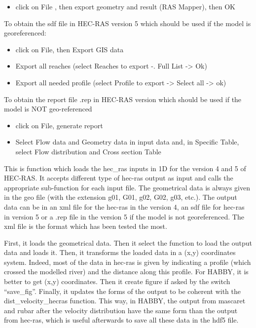 \documentclass[letterpaper,10pt,english]{sphinxmanual}
\begin{document}
\begin{fulllineitems}
\begin{itemize}
\item {} 
click on File , then export geometry and result (RAS Mapper), then OK

\end{itemize}

To obtain the sdf file in HEC-RAS version 5 which should be used if the model is georeferenced:
\begin{itemize}
\item {} 
click on File, then Export GIS data

\item {} 
Export all reaches (select Reaches to export -. Full List -\textgreater{} Ok)

\item {} 
Export all needed profile (select Profile to export -\textgreater{} Select all -\textgreater{} ok)

\end{itemize}

To obtain the report file .rep in HEC-RAS version which should be used if the model is NOT geo-referenced
\begin{itemize}
\item {} 
click on File, generate report

\item {} 
Select Flow data and Geometry data in input data and, in Specific Table, select Flow distribution and
Cross section Table

\end{itemize}


This is function which loads the hec\_ras inputs in 1D for the version 4 and 5 of HEC-RAS. It accepts different type
of hec-ras output as input and calls the appropriate sub-function for each input file.  The geometrical data is
always given in the geo file (with the extension g01, G01, g02, G02, g03, etc.). The output data can be in an xml
file for the hec-ras in the version 4, an sdf file for hec-ras in version 5 or a .rep file in the version 5 if the
model is not georeferenced. The xml file is the format which has been tested the most.

First, it loads the geometrical data. Then it select the function to load the output data and loads it. Then, it
transforms the loaded data in a (x,y) coordinates system. Indeed, most of the data in hec-ras is given by indicating
a profile (which crossed the modelled river) and the distance along this profile. For HABBY, it is better to get
(x,y) coordinates. Then it create figure if asked by the switch “save\_fig”. Finally, it updates the forms of the
output to be coherent with the dist\_velocity\_hecras function.  This way, in HABBY, the output from mascaret and
rubar after the velocity distribution have the same form than the output from hec-ras, which is useful afterwards
to save all these data in the hdf5 file.

\end{fulllineitems}
\end{document}
